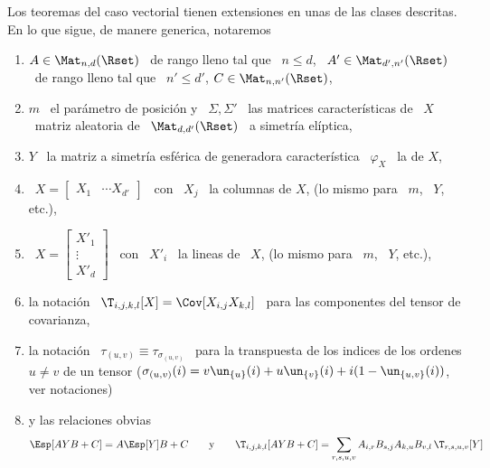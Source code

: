 Los  teoremas  del caso  vectorial  tienen extensiones  en  unas  de las  clases
descritas. En lo que sigue, de manere generica, notaremos
%
\begin{enumerate}[label = (N \arabic*)]
\item $A \in \Mat_{n,d}(\Rset)$ \ de rango lleno  tal que \ $n \le d$, \ $A' \in
  \Mat_{d',n'}(\Rset)$  \  de  rango  lleno  tal  que \  $n'  \le  d'$,  $C  \in
  \Mat_{n,n'}(\Rset)$,
%
\item $m$  \ el par\'ametro de posici\'on  y \ $\Sigma, \Sigma'$  \ las matrices
  caracter\'isticas de  \ $X$ \ matriz  aleatoria de \  $\Mat_{d,d'}(\Rset)$ \ a
  simetr\'ia el\'iptica,
%
\item $Y$ \  la matriz a simetr\'ia esf\'erica  de generadora caracter\'istica \
  $\varphi_X$ \ la de $X$,
%
\item \ $X = \begin{bmatrix} X_1 &  \cdots X_{d'} \end{bmatrix}$ \ con \ $X_j$ \
  la columnas de $X$, (lo mismo para \ $m$, \ $Y$, etc.),
%
\item \ $X = \begin{bmatrix} X'_1 \\ \vdots \\ X'_d \end{bmatrix}$ \ con \ $X'_i$ \
  la lineas de \ $X$, (lo mismo para \ $m$, \ $Y$, etc.),
%
\item  la notaci\'on \  $\T_{i,j,k,l}[X] =  \Cov[ X_{i,j}  X_{k,l}]$ \  para las
  componentes del tensor de covarianza,
%
\item  la notaci\'on  \ $\tau_{(u,v)}  \equiv \tau_{\sigma_{(u,v)}}$  \  para la
  transpuesta  de  los   indices  de  los  ordenes  $u  \ne   v$  de  un  tensor
  ($\sigma_{(u,v)}(i)   =   v   \un_{\{u\}}(i)    +   u   \un_{\{v\}}(i)   +   i
  (1-\un_{\{u,v\}}(i))$, ver notaciones)
%
\item\label{Enum:MP:RelacionesObvias} y las relaciones obvias
%
\[
\Esp[ A Y B + C] = A  \Esp[Y] B + C \qquad \mbox{y} \qquad \T_{i,j,k,l}[ A Y
B + C] = \sum_{r,s,u,v} A_{i,r} B_{s,j} A_{k,u} B_{v,l} \, \T_{r,s,u,v}[Y]
\]
\end{enumerate}
%
